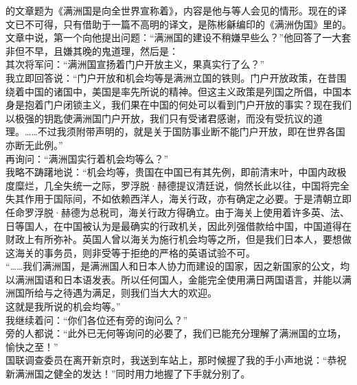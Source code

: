 的文章题为《满洲国是向全世界宣称着》，内容是他与等人会见的情形。现在的译文已不可得，只有借助于一篇不高明的译文，是陈彬龢编印的《满洲伪国》里的。文章中说，第一个向他提出问题：“满洲国的建设不稍嫌早些么？”他回答了一大套非但不早，且嫌其晚的鬼道理，然后是：\\

其次将军问：“满洲国宣扬着门户开放主义，果真实行了么？”\\

我立即回答说：“门户开放和机会均等是满洲立国的铁则。门户开放政策，在昔围绕着中国的诸国中，美国是率先所说的精神。但这主义政策是列国之所倡，中国本身是抱着门户闭锁主义，我们果在中国的何处可以看到门户开放的事实？现在我们以极强的钥匙使满洲国门户开放，我们只有受诸君感谢，而没有受抗议的道理。……不过我须附带声明的，就是关于国防事业断不能门户开放，即在世界各国亦断无此例。”\\

再询问：“满洲国实行着机会均等么？”\\

我略不踌躇地说：“机会均等，贵国在中国已有其先例，即前清末叶，中国内政极度糜烂，几全失统一之际，罗浮脱·赫德提议清廷说，倘然长此以往，中国将完全失其作用于国际间，不如依赖西洋人，海关行政，亦有确定之必要。于是清朝立即任命罗浮脱·赫德为总税司，海关行政方得确立。由于海关上使用着许多英、法、日等国人，在中国被认为是最确实的行政机关，因此列强借款给中国，中国道得在财政上有所弥补。英国人曾以海关为施行机会均等之所，但是我们日本人，要想做这海关的事务员，则非受等于拒绝的严格的英语试验不可。\\

“……我们满洲国，是满洲国人和日本人协力而建设的国家，因之新国家的公文，均以满洲国语和日本语发表。所以任何国人，金能完全使用满日两国语言，并能以满洲国所给与之待遇为满足，则我们当大大的欢迎。\\

这就是我所说的机会均等。”\\

我继续着问：“你们各位还有旁的询问么？”\\

旁的人都说：“此外已无何等询问的必要了，我们已能充分理解了满洲国的立场，愉快之至！”\\

国联调查委员在离开新京时，我送到车站上，那时候握了我的手小声地说：“恭祝新满洲国之健全的发达！”同时用力地握了下手就分别了。\\

